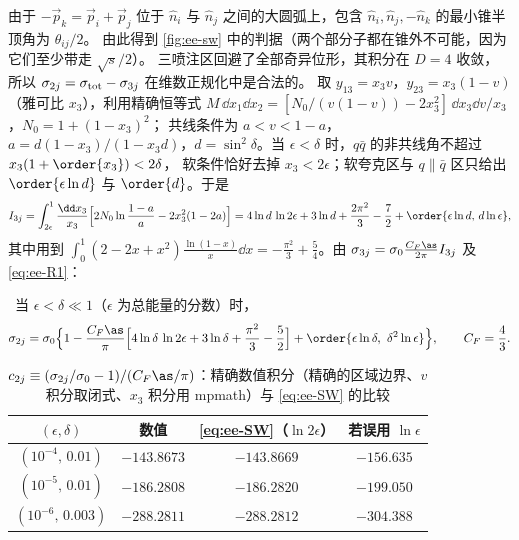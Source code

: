 由于 $-\vec p_k=\vec p_i+\vec p_j$ 位于 $\hat n_i$ 与 $\hat n_j$ 之间的大圆弧上，包含 $\hat n_i,\hat n_j,-\hat n_k$ 的最小锥半顶角为 $\theta_{ij}/2$。
由此得到 \cref{fig:ee-sw} 中的判据（两个部分子都在锥外不可能，因为它们至少带走 $\sqrt s/2$）。
三喷注区回避了全部奇异位形，其积分在 $D=4$ 收敛，所以 $\sigma_{2j}=\sigma_{\rm tot}-\sigma_{3j}$ 在维数正规化中是合法的。
取 $y_{13}=x_3v$，$y_{23}=x_3(1-v)$（雅可比 $x_3$），利用精确恒等式 $M\,\dd x_1\dd x_2=[N_0/(v(1-v))-2x_3^2]\,\dd x_3\dd v/x_3$，$N_0=1+(1-x_3)^2$；
共线条件为 $a<v<1-a$，$a=d(1-x_3)/(1-x_3d)$，$d=\sin^2\delta$。当 $\epsilon<\delta$ 时，$q\bar q$ 的非共线角不超过 $x_3(1+\order{x_3})<2\delta$，
软条件恰好去掉 $x_3<2\epsilon$；软夸克区与 $q\parallel\bar q$ 区只给出 $\order{\epsilon\ln d}$ 与 $\order{d}$。于是
\begin{equation}\label{eq:ee-I3j}
I_{3j}=\int_{2\epsilon}^1\frac{\dd x_3}{x_3}\Big[2N_0\ln\frac{1-a}{a}-2x_3^2(1-2a)\Big]
=4\ln d\,\ln2\epsilon+3\ln d+\frac{2\pi^2}{3}-\frac72+\order{\epsilon\ln d,\,d\ln\epsilon},
\end{equation}
其中用到 $\int_0^1(2-2x+x^2)\frac{\ln(1-x)}{x}\dd x=-\frac{\pi^2}{3}+\frac54$。由 $\sigma_{3j}=\sigma_0\frac{C_F\as}{2\pi}I_{3j}$ 及 \cref{eq:ee-R1}：

\begin{proposition}\label{prop:ee-sw}\tagR\
当 $\epsilon<\delta\ll1$（$\epsilon$ 为总能量的分数）时，
\begin{equation}\label{eq:ee-SW}
\sigma_{2j}=\sigma_0\Big\{1-\frac{C_F\as}{\pi}\Big[4\ln\delta\,\ln2\epsilon+3\ln\delta+\frac{\pi^2}{3}-\frac52\Big]+\order{\epsilon\ln\delta,\ \delta^2\ln\epsilon}\Big\},\qquad C_F=\frac43 .
\end{equation}
\end{proposition}

\begin{table}[htbp]
\centering
\caption{$c_{2j}\equiv(\sigma_{2j}/\sigma_0-1)/(C_F\as/\pi)$：精确数值积分（精确的区域边界、$v$ 积分取闭式、$x_3$ 积分用 mpmath）与 \cref{eq:ee-SW} 的比较}
\label{tab:ee-sw}
\begin{tabular}{cccc}
\toprule
$(\epsilon,\delta)$ & 数值 & \cref{eq:ee-SW}（$\ln2\epsilon$） & 若误用 $\ln\epsilon$ \\
\midrule
$(10^{-4},\,0.01)$ & $-143.8673$ & $-143.8669$ & $-156.635$\\
$(10^{-5},\,0.01)$ & $-186.2808$ & $-186.2820$ & $-199.050$\\
$(10^{-6},\,0.003)$ & $-288.2811$ & $-288.2812$ & $-304.388$\\
\bottomrule
\end{tabular}
\end{table}


